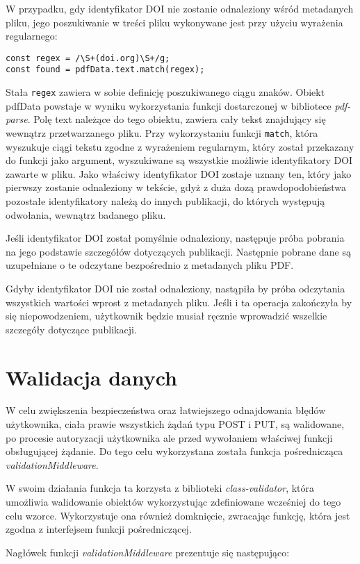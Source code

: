 \documentclass[a4paper,12pt,twoside,openany]{report}
\begin{document}
W przypadku, gdy identyfikator DOI nie zostanie odnaleziony wśród metadanych pliku, jego poszukiwanie w treści pliku wykonywane jest przy użyciu wyrażenia regularnego:
\begin{verbatim}
const regex = /\S+(doi.org)\S+/g;
const found = pdfData.text.match(regex);
\end{verbatim}
Stała \verb|regex| zawiera w sobie definicję poszukiwanego ciągu znaków. Obiekt pdfData powstaje w wyniku wykorzystania funkcji dostarczonej w bibliotece \textit{pdf-parse}. Polę text należące do tego obiektu, zawiera cały tekst znajdujący się wewnątrz przetwarzanego pliku. Przy wykorzystaniu funkcji \verb|match|, która wyszukuje ciągi tekstu zgodne z wyrażeniem regularnym, który został przekazany do funkcji jako argument, wyszukiwane są wszystkie możliwie identyfikatory DOI zawarte w pliku. Jako właściwy identyfikator DOI zostaje uznany ten, który jako pierwszy zostanie odnaleziony w tekście, gdyż z duża dozą prawdopodobieństwa pozostałe identyfikatory należą do innych publikacji, do których występują odwołania, wewnątrz badanego pliku.

Jeśli identyfikator DOI został pomyślnie odnaleziony, następuje próba pobrania na jego podstawie szczegółów dotyczących publikacji. Następnie pobrane dane są uzupełniane o te odczytane bezpośrednio z metadanych pliku PDF.

Gdyby identyfikator DOI nie został odnaleziony, nastąpiła by próba odczytania wszystkich wartości wprost z metadanych pliku. Jeśli i ta operacja zakończyła by się niepowodzeniem, użytkownik będzie musiał ręcznie wprowadzić wszelkie szczegóły dotyczące publikacji.

\section{Walidacja danych}
W celu zwiększenia bezpieczeństwa oraz łatwiejszego odnajdowania błędów użytkownika, ciała prawie wszystkich żądań typu POST i PUT, są walidowane, po procesie autoryzacji użytkownika ale przed wywołaniem właściwej funkcji obsługującej żądanie. Do tego celu wykorzystana została funkcja pośrednicząca \textit{validationMiddleware}. 

W swoim działania funkcja ta korzysta z biblioteki \textit{class-validator}, która umożliwia walidowanie obiektów wykorzystując zdefiniowane wcześniej do tego celu wzorce. Wykorzystuje ona również domknięcie, zwracając funkcję, która jest zgodna z interfejsem funkcji pośredniczącej.

Nagłówek funkcji \textit{validationMiddleware} prezentuje się następująco: 
\end{document}
